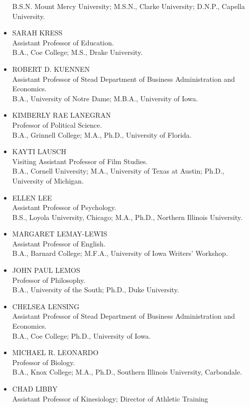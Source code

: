 \documentclass[
  letterpaper,
]{scrbook}
\begin{document}
\begin{itemize}
  B.S.N. Mount Mercy University; M.S.N., Clarke University; D.N.P.,
  Capella University.
\item
  SARAH KRESS\\
  Assistant Professor of Education.\\
  B.A., Coe College; M.S., Drake University.
\item
  ROBERT D. KUENNEN\\
  Assistant Professor of Stead Department of Business Administration and
  Economics.\\
  B.A., University of Notre Dame; M.B.A., University of Iowa.
\item
  KIMBERLY RAE LANEGRAN\\
  Professor of Political Science.\\
  B.A., Grinnell College; M.A., Ph.D., University of Florida.
\item
  KAYTI LAUSCH\\
  Visiting Assistant Professor of Film Studies.\\
  B.A., Cornell University; M.A., University of Texas at Austin; Ph.D.,
  University of Michigan.
\item
  ELLEN LEE\\
  Assistant Professor of Psychology.\\
  B.S., Loyola University, Chicago; M.A., Ph.D., Northern Illinois
  University.
\item
  MARGARET LEMAY-LEWIS\\
  Assistant Professor of English.\\
  B.A., Barnard College; M.F.A., University of Iowa Writers' Workshop.
\item
  JOHN PAUL LEMOS\\
  Professor of Philosophy.\\
  B.A., University of the South; Ph.D., Duke University.
\item
  CHELSEA LENSING\\
  Assistant Professor of Stead Department of Business Administration and
  Economics.\\
  B.A., Coe College; Ph.D., University of Iowa.
\item
  MICHAEL R. LEONARDO\\
  Professor of Biology.\\
  B.A., Knox College; M.A., Ph.D., Southern Illinois University,
  Carbondale.
\item
  CHAD LIBBY\\
  Assistant Professor of Kinesiology; Director of Athletic Training

\end{itemize}
\end{document}
